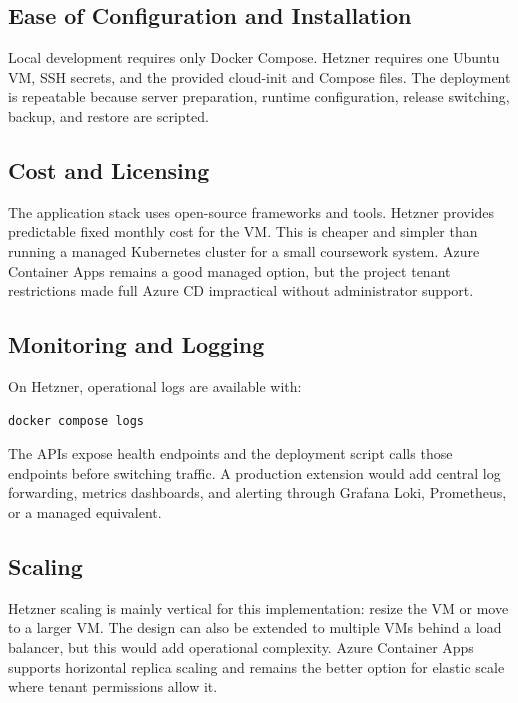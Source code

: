 \documentclass[11pt,a4paper]{article}
\begin{document}
\subsection{Ease of Configuration and Installation}

Local development requires only Docker Compose. Hetzner requires one Ubuntu VM, SSH secrets, and the provided cloud-init and Compose files. The deployment is repeatable because server preparation, runtime configuration, release switching, backup, and restore are scripted.

\subsection{Cost and Licensing}

The application stack uses open-source frameworks and tools. Hetzner provides predictable fixed monthly cost for the VM. This is cheaper and simpler than running a managed Kubernetes cluster for a small coursework system. Azure Container Apps remains a good managed option, but the project tenant restrictions made full Azure CD impractical without administrator support.

\subsection{Monitoring and Logging}

On Hetzner, operational logs are available with:

\begin{lstlisting}
docker compose logs
\end{lstlisting}

The APIs expose health endpoints and the deployment script calls those endpoints before switching traffic. A production extension would add central log forwarding, metrics dashboards, and alerting through Grafana Loki, Prometheus, or a managed equivalent.

\subsection{Scaling}

Hetzner scaling is mainly vertical for this implementation: resize the VM or move to a larger VM. The design can also be extended to multiple VMs behind a load balancer, but this would add operational complexity. Azure Container Apps supports horizontal replica scaling and remains the better option for elastic scale where tenant permissions allow it.
\end{document}
